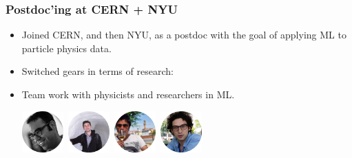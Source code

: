 \documentclass{beamer}
\begin{document}
\begin{frame}
    \frametitle{Postdoc'ing at CERN + NYU}

    \begin{itemize}
        \item Joined CERN, and then NYU, as a postdoc with the goal of applying ML to particle physics data.

        \vspace{0.5cm}

        \item Switched gears in terms of research:

        \vspace{0.5cm}

        \item Team work with physicists and researchers in ML.

        \begin{center}
            \includegraphics[width=0.125\textwidth]{figures/faces/kyle.png}\
            \includegraphics[width=0.125\textwidth]{figures/faces/lukas.png}\
            \includegraphics[width=0.125\textwidth]{figures/faces/juan.png}\
            \includegraphics[width=0.125\textwidth]{figures/faces/michael.png}


\end{center}
\end{itemize}
\end{frame}
\end{document}
